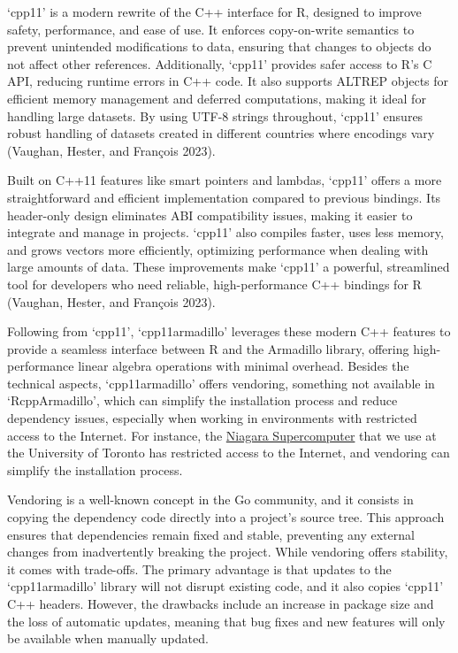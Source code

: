 \documentclass[preprint,12pt]{elsarticle}
\begin{document}
`cpp11' is a modern rewrite of the C++ interface for R, designed to
improve safety, performance, and ease of use. It enforces copy-on-write
semantics to prevent unintended modifications to data, ensuring that
changes to objects do not affect other references. Additionally, `cpp11'
provides safer access to R's C API, reducing runtime errors in C++ code.
It also supports ALTREP objects for efficient memory management and
deferred computations, making it ideal for handling large datasets. By
using UTF-8 strings throughout, `cpp11' ensures robust handling of
datasets created in different countries where encodings vary (Vaughan,
Hester, and François 2023).

Built on C++11 features like smart pointers and lambdas, `cpp11' offers
a more straightforward and efficient implementation compared to previous
bindings. Its header-only design eliminates ABI compatibility issues,
making it easier to integrate and manage in projects. `cpp11' also
compiles faster, uses less memory, and grows vectors more efficiently,
optimizing performance when dealing with large amounts of data. These
improvements make `cpp11' a powerful, streamlined tool for developers
who need reliable, high-performance C++ bindings for R (Vaughan, Hester,
and François 2023).

Following from `cpp11', `cpp11armadillo' leverages these modern C++
features to provide a seamless interface between R and the Armadillo
library, offering high-performance linear algebra operations with
minimal overhead. Besides the technical aspects, `cpp11armadillo' offers
vendoring, something not available in `RcppArmadillo', which can
simplify the installation process and reduce dependency issues,
especially when working in environments with restricted access to the
Internet. For instance, the
\href{https://docs.scinet.utoronto.ca/index.php/Niagara_Quickstart}{Niagara
Supercomputer} that we use at the University of Toronto has restricted
access to the Internet, and vendoring can simplify the installation
process.

Vendoring is a well-known concept in the Go community, and it consists
in copying the dependency code directly into a project's source tree.
This approach ensures that dependencies remain fixed and stable,
preventing any external changes from inadvertently breaking the project.
While vendoring offers stability, it comes with trade-offs. The primary
advantage is that updates to the `cpp11armadillo' library will not
disrupt existing code, and it also copies `cpp11' C++ headers. However,
the drawbacks include an increase in package size and the loss of
automatic updates, meaning that bug fixes and new features will only be
available when manually updated.
\end{document}
